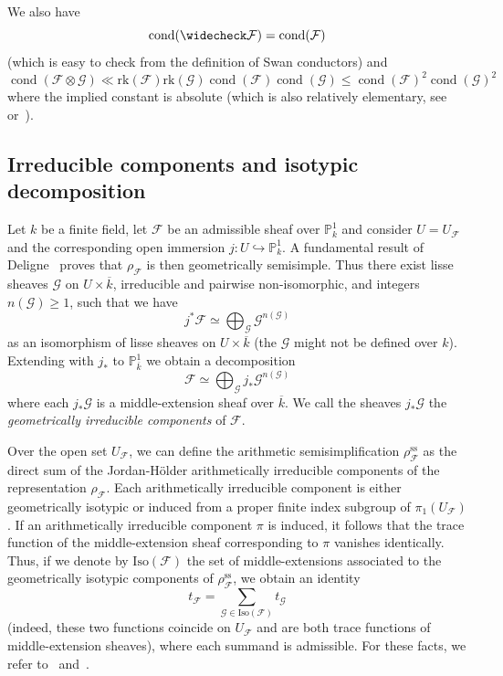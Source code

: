 \documentclass[12pt,a4paper,reqno]{amsart}
\numberwithin{equation}{section}
\DeclareMathOperator*\cond{cond}
\theoremstyle{plain}
\theoremstyle{definition}
\newcommand\rk{\mathrm{rk}}
\newcommand\ov{\overline}
\newcommand\wcheck{\widecheck}
\newcommand\mcF{\mathcal{F}}
\newcommand\mcG{\mathcal{G}}
\newcommand\Pl{\mathbb{P}^1}
\begin{document}
We also have
\begin{equation}\label{cond-1}
\cond(\wcheck \mcF) = \cond(\mcF)
\end{equation}
(which is easy to check from the definition of Swan conductors) and
\begin{equation}\label{cond-2}
  \cond(\mcF\otimes\mcG)\ll \rk(\mcF)\rk(\mcG)\cond(\mcF)\cond(\mcG)
  \leq \cond(\mcF)^2\cond(\mcG)^2
\end{equation}
where the implied constant is absolute (which is also relatively
elementary, see \cite[Prop. 8.2(2)]{FKM1} or~\cite[Lemma
4.8]{transforms}).

\subsection{Irreducible components and isotypic decomposition}

Let $k$ be a finite field, let $\mcF$ be an admissible sheaf over
$\Pl_k$ and consider $U=U_{\mcF}$ and the corresponding open immersion
$j\colon U\hookrightarrow \Pl_{k}$.  A fundamental result of
Deligne~\cite[(3.4.1)]{WeilII} proves that $\rho_{\mcF}$ is then
geometrically semisimple. Thus there exist lisse sheaves $\mcG$ on
$U\times\ov{k}$, irreducible and pairwise non-isomorphic, and integers
$n(\mcG)\geq 1$, such that we have
$$
j^*\mcF\simeq \bigoplus_{\mcG}\mcG^{n(\mcG)}
$$
as an isomorphism of lisse sheaves on $U\times\ov{k}$ (the $\mcG$
might not be defined over $k$). Extending with $j_*$ to $\Pl_{\ov{k}}$
we obtain a decomposition
$$
\mcF\simeq \bigoplus_{\mcG}j_*\mcG^{n(\mcG)}
$$
where each $j_*\mcG$ is a middle-extension sheaf over $\ov{k}$. We
call the sheaves $j_*\mcG$ the \emph{geometrically irreducible
  components} of $\mcF$.
\par
Over the open set $U_{\mcF}$, we can define the arithmetic
semisimplification $\rho_{\mcF}^{\text{ss}}$ as the direct sum of the
Jordan-H\"older arithmetically irreducible components of the
representation $\rho_{\mcF}$. Each arithmetically irreducible
component is either geometrically isotypic or induced from a proper
finite index subgroup of $\pi_1(U_{\mcF})$.  If an arithmetically
irreducible component $\pi$ is induced, it follows that the trace
function of the middle-extension sheaf corresponding to $\pi$ vanishes
identically. Thus, if we denote by $\mathrm{Iso}(\mcF)$ the set of
middle-extensions associated to the geometrically isotypic components
of $\rho_{\mcF}^{\text{ss}}$, we obtain an identity
\begin{equation}\label{eq-isotypic}
 t_\mcF=\sum_{\mcG\in \mathrm{Iso}(\mcF)}t_{\mcG}
\end{equation}
(indeed, these two functions coincide on $U_{\mcF}$ and are both trace
functions of middle-extension sheaves), where each summand is
admissible. For these facts, we refer to~\cite[\S 4.4, \S
4.5]{katz-sommes} and~\cite[Prop. 8.3]{FKM1}.
\end{document}
